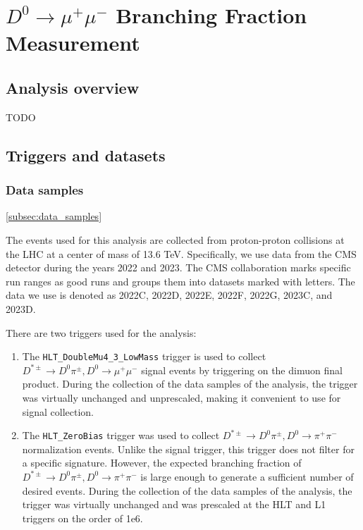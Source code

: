\chapter{$D^0 \to \mu^+\mu^-$ Branching Fraction Measurement}

\section{Analysis overview}

TODO

\section{Triggers and datasets}

\subsection{Data samples}

\ref{subsec:data_samples}

The events used for this analysis are collected from proton-proton collisions at the LHC at a center of mass of 13.6 TeV. Specifically, we use data from the CMS detector during the years 2022 and 2023. The CMS collaboration marks specific run ranges as good runs and groups them into datasets marked with letters. The data we use is denoted as 2022C, 2022D, 2022E, 2022F, 2022G, 2023C, and 2023D. 

There are two triggers used for the analysis:
\begin{enumerate}
    \item The \texttt{HLT\_DoubleMu4\_3\_LowMass} trigger is used to collect $D^{*\pm} \to D^0 \pi^\pm, D^0 \to \mu^+ \mu^-$ signal events by triggering on the dimuon final product. During the collection of the data samples of the analysis, the trigger was virtually unchanged and unprescaled, making it convenient to use for signal collection.
    \item The \texttt{HLT\_ZeroBias} trigger was used to collect $D^{*\pm} \to D^0 \pi^\pm, D^0 \to \pi^+ \pi^-$ normalization events. Unlike the signal trigger, this trigger does not filter for a specific signature. However, the expected branching fraction of $D^{*\pm} \to D^0 \pi^\pm, D^0 \to \pi^+ \pi^-$ is large enough to generate a sufficient number of desired events. During the collection of the data samples of the analysis, the trigger was virtually unchanged and was prescaled at the HLT and L1 triggers on the order of 1e6. 
\end{enumerate}

